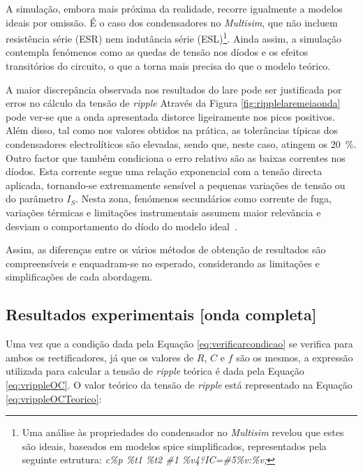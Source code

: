 A simulação, embora mais próxima da realidade, recorre igualmente a modelos ideais por omissão. É o caso dos condensadores no \textit{Multisim}, que não incluem resistência série (ESR) nem indutância série (ESL)\footnote{Uma análise às propriedades do condensador no \textit{Multisim} revelou que estes são ideais, baseados em modelos \acrshort{spice} simplificados, representados pela seguinte estrutura: \textit{c\%p \%t1 \%t2 \#1 \%v4?IC=\#5\%v:\%v;}}. Ainda assim, a simulação contempla fenómenos como as quedas de tensão nos díodos e os efeitos transitórios do circuito, o que a torna mais precisa do que o modelo teórico.

A maior discrepância observada nos resultados do \acrshort{lare} pode ser justificada por erros no cálculo da tensão de \textit{ripple} Através da Figura \ref{fig:ripplelaremeiaonda} pode ver-se que a onda apresentada distorce ligeiramente nos picos positivos. Além disso, tal como nos valores obtidos na prática, as tolerâncias típicas dos condensadores electrolíticos são elevadas, sendo que, neste caso, atingem os \SI{20}{\percent}\cite{toleranciacondensadores}. Outro factor que também condiciona o erro relativo são as baixas correntes nos díodos. Esta corrente segue uma relação exponencial com a tensão directa aplicada, tornando-se extremamente sensível a pequenas variações de tensão ou do parâmetro $I_{S}$. Nesta zona, fenómenos secundários como corrente de fuga, variações térmicas e limitações instrumentais assumem maior relevância e desviam o comportamento do díodo do modelo ideal~\cite{sedrasmith}.

Assim, as diferenças entre os vários métodos de obtenção de resultados são compreensíveis e enquadram-se no esperado, considerando as limitações e simplificações de cada abordagem.

\subsection{Resultados experimentais [onda completa]}
\label{sec:resultados_RectificadoresOndacompleta}
Uma vez que a condição dada pela Equação \ref{eq:verificarcondicao} se verifica para ambos os rectificadores, já que os valores de $R$, $C$ e $f$ são os mesmos, a expressão utilizada para calcular a tensão de \textit{ripple} teórica é dada pela Equação \ref{eq:vrippleOC}. O valor teórico da tensão de \textit{ripple} está representado na Equação \ref{eq:vrippleOCTeorico}:

